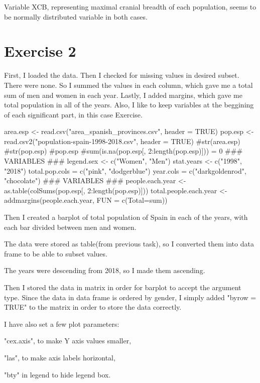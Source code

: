 \documentclass[12pt, oneside]{report}\usepackage[]{graphicx}\usepackage[]{color}
\begin{document}
Variable XCB, representing maximal cranial breadth of each population, 
seems to be normally distributed variable in both cases.

\newpage
\section*{Exercise 2}

First, I loaded the data. Then I checked for missing values in desired subset. There were none. So I summed the values in each column, which gave me a total sum of men and women in each year. Lastly, I added margins, which gave me total population in all of the years.
Also, I like to keep variables at the beggining of each significant part, in this case Exercise.

\begin{Schunk}
\begin{Sinput}
area.esp <- read.csv("area_spanish_provinces.csv", header = TRUE)
pop.esp <- read.csv2("population-spain-1998-2018.csv", header = TRUE)
#str(area.esp)
#str(pop.esp)
#pop.esp
#sum(is.na(pop.esp[, 2:length(pop.esp)])) = 0
### VARIABLES ###
legend.sex <- c("Women", "Men")
stat.years <-  c("1998", "2018")
total.pop.cols = c("pink", "dodgerblue")
year.cols = c("darkgoldenrod", "chocolate")
### VARIABLES ###
people.each.year <- as.table(colSums(pop.esp[, 2:length(pop.esp)]))
total.people.each.year <- addmargins(people.each.year, FUN = c(Total=sum))
\end{Sinput}
\end{Schunk}

Then I created a barplot of total population of Spain in each of the years, with each bar divided between men and women. 

\noindent The data were stored as table(from previous task), so I converted them into data frame to be able to subset values. 

\noindent The years were descending from 2018, so I made them ascending. 

\noindent Then I stored the data in matrix in order for barplot to accept the argument type. Since the data in data frame is ordered by gender, I simply added "byrow = TRUE" to the matrix in order to store the data correctly. 

\noindent I have also set a few plot parameters: 

"cex.axis", to make Y axis values smaller,

"las", to make axis labels horizontal,

"bty" in legend to hide legend box.
\end{document}
